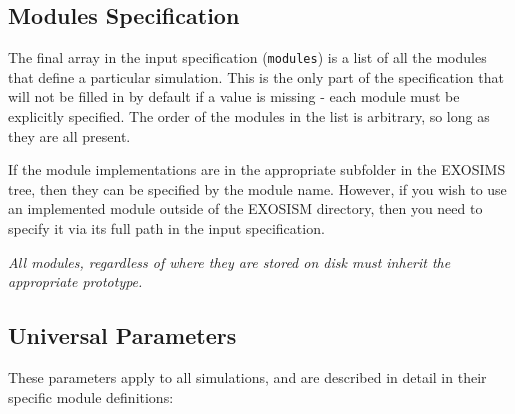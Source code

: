 \documentclass[cleanfoot]{asme2ej}
\begin{document}
\subsection{Modules Specification}
The final array in the input specification  (\verb+modules+) is a list of all the modules that define a particular simulation.  This is the only part of the specification that will not be filled in by default if a value is missing - each module must be explicitly specified. The order of the modules in the list is arbitrary, so long as they are all present. 

If the module implementations are in the appropriate subfolder in the EXOSIMS tree, then they can be specified by the module name.  However, if you wish to use an implemented module outside of the EXOSISM directory, then you need to specify it via its full path in the input specification.

\emph{All modules, regardless of where they are stored on disk must inherit the appropriate prototype.}

\subsection{Universal Parameters}
These parameters apply to all simulations, and are described in detail in their specific module definitions:
\end{document}
